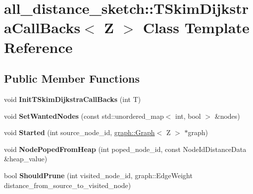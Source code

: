 \hypertarget{classall__distance__sketch_1_1TSkimDijkstraCallBacks}{}\section{all\+\_\+distance\+\_\+sketch\+:\+:T\+Skim\+Dijkstra\+Call\+Backs$<$ Z $>$ Class Template Reference}
\label{classall__distance__sketch_1_1TSkimDijkstraCallBacks}
\subsection*{Public Member Functions}
\begin{DoxyCompactItemize}
\item 
\hypertarget{classall__distance__sketch_1_1TSkimDijkstraCallBacks_aeb7e91ff9f3e4417140790186a8b1119}{}void {\bfseries Init\+T\+Skim\+Dijkstra\+Call\+Backs} (int T)\label{classall__distance__sketch_1_1TSkimDijkstraCallBacks_aeb7e91ff9f3e4417140790186a8b1119}

\item 
\hypertarget{classall__distance__sketch_1_1TSkimDijkstraCallBacks_ac48e37f3f1de4b19dada700645797594}{}void {\bfseries Set\+Wanted\+Nodes} (const std\+::unordered\+\_\+map$<$ int, bool $>$ \&nodes)\label{classall__distance__sketch_1_1TSkimDijkstraCallBacks_ac48e37f3f1de4b19dada700645797594}

\item 
\hypertarget{classall__distance__sketch_1_1TSkimDijkstraCallBacks_a62806f7ff534a858b31af478e55e4c84}{}void {\bfseries Started} (int source\+\_\+node\+\_\+id, \hyperlink{classall__distance__sketch_1_1graph_1_1Graph}{graph\+::\+Graph}$<$ Z $>$ $\ast$graph)\label{classall__distance__sketch_1_1TSkimDijkstraCallBacks_a62806f7ff534a858b31af478e55e4c84}

\item 
\hypertarget{classall__distance__sketch_1_1TSkimDijkstraCallBacks_a115a95e5a734c557cc4bd22d1985a06d}{}void {\bfseries Node\+Poped\+From\+Heap} (int poped\+\_\+node\+\_\+id, const Node\+Id\+Distance\+Data \&heap\+\_\+value)\label{classall__distance__sketch_1_1TSkimDijkstraCallBacks_a115a95e5a734c557cc4bd22d1985a06d}

\item 
\hypertarget{classall__distance__sketch_1_1TSkimDijkstraCallBacks_a5c9af96762e934bf6c0f7d6e4a9dbc40}{}bool {\bfseries Should\+Prune} (int visited\+\_\+node\+\_\+id, graph\+::\+Edge\+Weight distance\+\_\+from\+\_\+source\+\_\+to\+\_\+visited\+\_\+node)\label{classall__distance__sketch_1_1TSkimDijkstraCallBacks_a5c9af96762e934bf6c0f7d6e4a9dbc40}


\end{DoxyCompactItemize}
